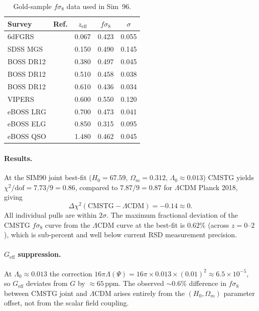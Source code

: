 \documentclass[12pt,a4paper]{article}
\begin{document}
\begin{table}[h]
\centering
\caption{Gold-sample $f\sigma_8$ data used in Sim~96.}
\label{tab:rsd_data}
\begin{tabular}{llccc}
\hline
Survey & Ref. & $z_\mathrm{eff}$ & $f\sigma_8$ & $\sigma$ \\
\hline
6dFGRS      & \citet{Beutler2012}   & 0.067 & 0.423 & 0.055 \\
SDSS MGS    & \citet{Howlett2015}   & 0.150 & 0.490 & 0.145 \\
BOSS DR12   & \citet{Alam2017}      & 0.380 & 0.497 & 0.045 \\
BOSS DR12   & \citet{Alam2017}      & 0.510 & 0.458 & 0.038 \\
BOSS DR12   & \citet{Alam2017}      & 0.610 & 0.436 & 0.034 \\
VIPERS      & \citet{Pezzotta2017}  & 0.600 & 0.550 & 0.120 \\
eBOSS LRG   & \citet{GilMarin2020}  & 0.700 & 0.473 & 0.041 \\
eBOSS ELG   & \citet{deMattia2021}  & 0.850 & 0.315 & 0.095 \\
eBOSS QSO   & \citet{Neveux2020}    & 1.480 & 0.462 & 0.045 \\
\hline
\end{tabular}
\end{table}

\paragraph{Results.}  At the SIM90 joint best-fit ($H_0=67.59$, $\Omega_m=0.312$,
$\Lambda_0\approx0.013$) CMSTG yields $\chi^2/\mathrm{dof}=7.73/9=0.86$, compared to
$7.87/9=0.87$ for $\Lambda$CDM Planck 2018, giving
\begin{equation}
  \Delta\chi^2(\mathrm{CMSTG}-\Lambda\mathrm{CDM}) = -0.14 \approx 0.
\end{equation}
All individual pulls are within $2\sigma$.  The maximum fractional deviation of the
CMSTG $f\sigma_8$ curve from the $\Lambda$CDM curve at the best-fit is $0.62\%$
(across $z=0$--$2$), which is sub-percent and well below current RSD measurement
precision.

\paragraph{$G_\mathrm{eff}$ suppression.}  At $\Lambda_0\approx0.013$ the correction
$16\pi\Lambda(\Psi)= 16\pi\times0.013\times(0.01)^2\approx6.5\times10^{-5}$, so
$G_\mathrm{eff}$ deviates from $G$ by $\approx65\,\mathrm{ppm}$.  The observed
$\sim\!0.6\%$ difference in $f\sigma_8$ between CMSTG joint and $\Lambda$CDM arises
entirely from the $(H_0,\Omega_m)$ parameter offset, not from the scalar field coupling.
\end{document}
